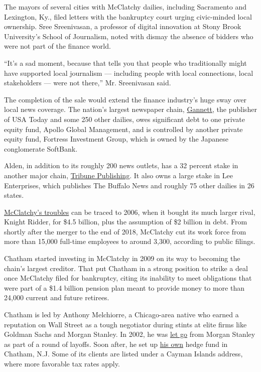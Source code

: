 The mayors of several cities with McClatchy dailies, including
Sacramento and Lexington, Ky., filed letters with the bankruptcy court
urging civic-minded local ownership. Sree Sreenivasan, a professor of
digital innovation at Stony Brook University's School of Journalism,
noted with dismay the absence of bidders who were not part of the
finance world.

``It's a sad moment, because that tells you that people who
traditionally might have supported local journalism --- including people
with local connections, local stakeholders --- were not there,'' Mr.
Sreenivasan said.

The completion of the sale would extend the finance industry's huge sway
over local news coverage. The nation's largest newspaper chain,
\href{https://www.nytimes.com/2019/11/19/business/media/gannett-gatehouse-merger.html}{Gannett},
the publisher of USA Today and some 250 other dailies, owes significant
debt to one private equity fund, Apollo Global Management, and is
controlled by another private equity fund, Fortress Investment Group,
which is owned by the Japanese conglomerate SoftBank.

Alden, in addition to its roughly 200 news outlets, has a 32 percent
stake in another major chain,
\href{https://www.nytimes.com/2020/07/02/business/media/tribune-alden-board-seat.html}{Tribune
Publishing}. It also owns a large stake in Lee Enterprises, which
publishes The Buffalo News and roughly 75 other dailies in 26 states.

\href{https://www.nytimes.com/2006/03/13/business/media/newspaper-chain-agrees-to-a-sale-for-45-billion.html}{McClatchy's
troubles} can be traced to 2006, when it bought its much larger rival,
Knight Ridder, for \$4.5 billion, plus the assumption of \$2 billion in
debt. From shortly after the merger to the end of 2018, McClatchy cut
its work force from more than 15,000 full-time employees to around
3,300, according to public filings.

Chatham started investing in McClatchy in 2009 on its way to becoming
the chain's largest creditor. That put Chatham in a strong position to
strike a deal once McClatchy filed for bankruptcy, citing its inability
to meet obligations that were part of a \$1.4 billion pension plan meant
to provide money to more than 24,000 current and future retirees.

Chatham is led by Anthony Melchiorre, a Chicago-area native who earned a
reputation on Wall Street as a tough negotiator during stints at elite
firms like Goldman Sachs and Morgan Stanley. In 2002, he was
\href{https://www.fnlondon.com/articles/morgan-stanley-cuts-leveraged-finance-as-bank-cull-hits-2500-20021121}{let
go} from Morgan Stanley as part of a round of layoffs. Soon after, he
set up
\href{https://www.sec.gov/Archives/edgar/data/915802/000091580217000002/redmontprochathamsupplement0.htm}{his
own} hedge fund in Chatham, N.J. Some of its clients are listed under a
Cayman Islands address, where more favorable tax rates apply.


